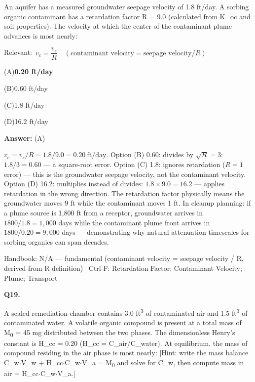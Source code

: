 \documentclass[11pt]{article}
\newcommand{\correct}[1]{\textbf{#1}\;{\color{accent}$\checkmark$}}
\newcommand{\optline}[2]{\par\noindent\hspace{1.2em}(#1)\hspace{0.6em}#2}
\begin{document}
An aquifer has a measured groundwater seepage velocity of 1.8 ft/day. A sorbing organic contaminant has a retardation factor R = 9.0 (calculated from K\_oc and soil properties). The velocity at which the center of the contaminant plume advances is most nearly:\par\vspace{3pt}
{\small\color{soft}Relevant:}\ $v_c = \dfrac{v_s}{R}\quad(\text{contaminant velocity} = \text{seepage velocity}/R)$\par\vspace{3pt}
\optline{A}{\correct{0.20 ft/day}}
\optline{B}{0.60 ft/day}
\optline{C}{1.8 ft/day}
\optline{D}{16.2 ft/day}
\par\vspace{3pt}
\vspace{2pt}\par\noindent\colorbox{boxbg}{\parbox{\dimexpr\linewidth-2\fboxsep\relax}{%
\vspace{2pt}\textbf{Answer:} (A)\par\vspace{2pt}
{\small $v_c = v_s/R = 1.8/9.0 = 0.20\ \mathrm{ft/day}$. Option (B) 0.60: divides by $\sqrt{R} = 3$: $1.8/3 = 0.60$ --- a square-root error. Option (C) 1.8: ignores retardation ($R=1$ error) --- this is the groundwater seepage velocity, not the contaminant velocity. Option (D) 16.2: multiplies instead of divides: $1.8\times9.0 = 16.2$ --- applies retardation in the wrong direction. The retardation factor physically means the groundwater moves 9 ft while the contaminant moves 1 ft. In cleanup planning: if a plume source is 1,800 ft from a receptor, groundwater arrives in $1800/1.8 = 1{,}000$ days while the contaminant plume front arrives in $1800/0.20 = 9{,}000$ days --- demonstrating why natural attenuation timescales for sorbing organics can span decades.}\par\vspace{2pt}
{\footnotesize\color{soft}Handbook: N/A --- fundamental (contaminant velocity = seepage velocity / R, derived from R definition) \textbullet\ Ctrl-F: Retardation Factor; Contaminant Velocity; Plume; Transport}\vspace{2pt}
}}
\vspace{9pt}
\filbreak
\textbf{\color{accent}Q19.}\par\vspace{2pt}
A sealed remediation chamber contains 3.0 ft\textsuperscript{3} of contaminated air and 1.5 ft\textsuperscript{3} of contaminated water. A volatile organic compound is present at a total mass of M\textsubscript{0} = 45 mg distributed between the two phases. The dimensionless Henry's constant is H\_cc = 0.20 (H\_cc = C\_air/C\_water). At equilibrium, the mass of compound residing in the air phase is most nearly: [Hint: write the mass balance C\_w$\cdot$V\_w + H\_cc$\cdot$C\_w$\cdot$V\_a = M\textsubscript{0} and solve for C\_w, then compute mass in air = H\_cc$\cdot$C\_w$\cdot$V\_a.]\par\vspace{3pt}
\end{document}
